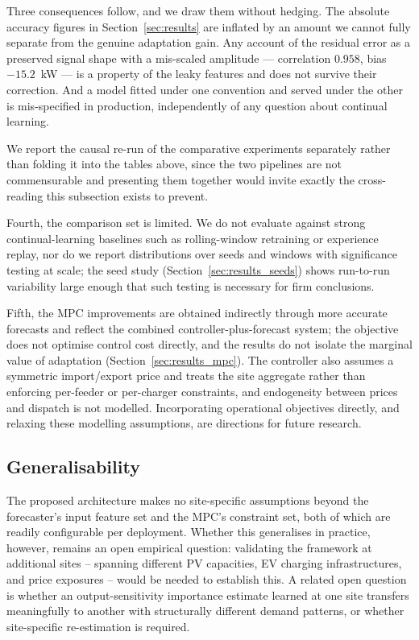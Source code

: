 \documentclass[journal]{IEEEtran}
\begin{document}
Three consequences follow, and we draw them without hedging. The absolute
accuracy figures in Section~\ref{sec:results} are inflated by an amount we
cannot fully separate from the genuine adaptation gain. Any account of the
residual error as a preserved signal shape with a mis-scaled amplitude ---
correlation $0.958$, bias $-15.2$~kW --- is a property of the leaky
features and does not survive their correction. And a model fitted under
one convention and served under the other is mis-specified in production,
independently of any question about continual learning.

We report the causal re-run of the comparative experiments separately
rather than folding it into the tables above, since the two pipelines are
not commensurable and presenting them together would invite exactly the
cross-reading this subsection exists to prevent.

Fourth, the comparison set is limited. We do not evaluate against strong
continual-learning baselines such as rolling-window retraining or
experience replay, nor do we report distributions over seeds and windows
with significance testing at scale; the seed study
(Section~\ref{sec:results_seeds}) shows run-to-run variability large
enough that such testing is necessary for firm conclusions.

Fifth, the MPC improvements are obtained indirectly through more accurate
forecasts and reflect the combined controller-plus-forecast system; the
objective does not optimise control cost directly, and the results do not
isolate the marginal value of adaptation (Section~\ref{sec:results_mpc}).
The controller also assumes a symmetric import/export price and treats
the site aggregate rather than enforcing per-feeder or per-charger
constraints, and endogeneity between prices and dispatch is not modelled.
Incorporating operational objectives directly, and relaxing these
modelling assumptions, are directions for future research.
\subsection{Generalisability}

The proposed architecture makes no site-specific assumptions beyond
the forecaster's input feature set and the MPC's constraint set, both
of which are readily configurable per deployment. Whether this
generalises in practice, however, remains an open empirical question:
validating the framework at additional sites --
spanning different PV capacities, EV charging infrastructures, and
price exposures -- would be needed to establish this. A related open
question is whether an output-sensitivity importance estimate learned at
one site transfers meaningfully to another with structurally different
demand patterns, or whether site-specific re-estimation is required.
\end{document}
